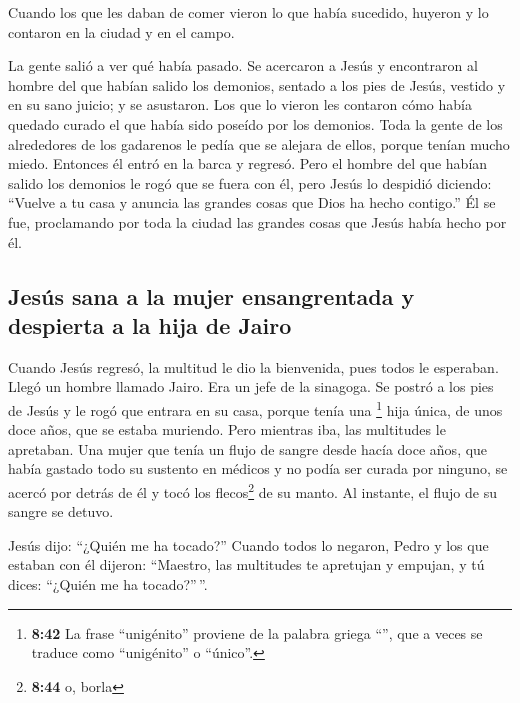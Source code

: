 \begin{paracol}{2}
 Cuando los que les daban de comer vieron lo que había
sucedido, huyeron y lo contaron en la ciudad y en el campo.

 La gente salió a ver qué había pasado. Se acercaron a
Jesús y encontraron al hombre del que habían salido los demonios,
sentado a los pies de Jesús, vestido y en su sano juicio; y se
asustaron.  Los que lo vieron les contaron cómo había
quedado curado el que había sido poseído por los demonios.
 Toda la gente de los alrededores de los gadarenos le
pedía que se alejara de ellos, porque tenían mucho miedo. Entonces él
entró en la barca y regresó.  Pero el hombre del que
habían salido los demonios le rogó que se fuera con él, pero Jesús lo
despidió diciendo:  ``Vuelve a tu casa y anuncia las
grandes cosas que Dios ha hecho contigo.'' Él se fue, proclamando por
toda la ciudad las grandes cosas que Jesús había hecho por él.

\hypertarget{jesuxfas-sana-a-la-mujer-ensangrentada-y-despierta-a-la-hija-de-jairo}{%
\subsection{Jesús sana a la mujer ensangrentada y despierta a la hija de
Jairo}\label{jesuxfas-sana-a-la-mujer-ensangrentada-y-despierta-a-la-hija-de-jairo}}

 Cuando Jesús regresó, la multitud le dio la bienvenida,
pues todos le esperaban.  Llegó un hombre llamado Jairo.
Era un jefe de la sinagoga. Se postró a los pies de Jesús y le rogó que
entrara en su casa,  porque tenía una \footnote{\textbf{8:42}
  La frase ``unigénito'' proviene de la palabra griega
  ``'', que a veces se traduce como ``unigénito'' o
  ``único''.} hija única, de unos doce años, que se estaba muriendo.
Pero mientras iba, las multitudes le apretaban.  Una
mujer que tenía un flujo de sangre desde hacía doce años, que había
gastado todo su sustento en médicos y no podía ser curada por ninguno,
 se acercó por detrás de él y tocó los flecos\footnote{\textbf{8:44}
  o, borla} de su manto. Al instante, el flujo de su sangre se detuvo.

 Jesús dijo: ``¿Quién me ha tocado?'' Cuando todos lo
negaron, Pedro y los que estaban con él dijeron: ``Maestro, las
multitudes te apretujan y empujan, y tú dices: ``¿Quién me ha
tocado?''\,''.


\end{paracol}
